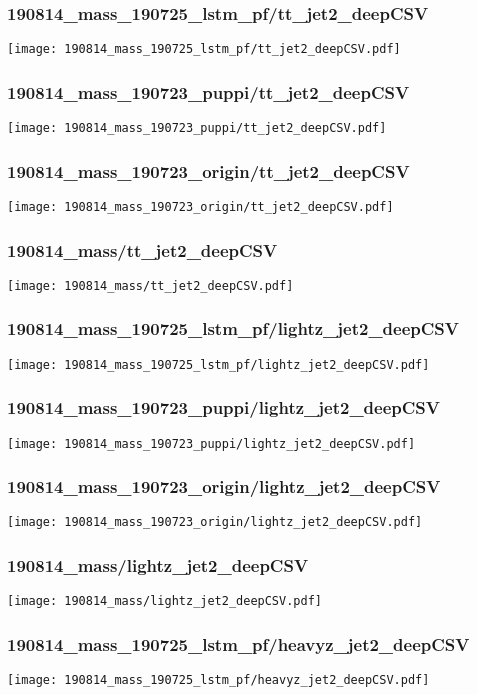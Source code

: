 \begin{frame}
   \frametitle{\small 190814\_mass\_190725\_lstm\_pf/tt\_jet2\_deepCSV}
   \centering
   \texttt{[image: 190814\_mass\_190725\_lstm\_pf/tt\_jet2\_deepCSV.pdf]}
\end{frame}

\begin{frame}
   \frametitle{\small 190814\_mass\_190723\_puppi/tt\_jet2\_deepCSV}
   \centering
   \texttt{[image: 190814\_mass\_190723\_puppi/tt\_jet2\_deepCSV.pdf]}
\end{frame}

\begin{frame}
   \frametitle{\small 190814\_mass\_190723\_origin/tt\_jet2\_deepCSV}
   \centering
   \texttt{[image: 190814\_mass\_190723\_origin/tt\_jet2\_deepCSV.pdf]}
\end{frame}

\begin{frame}
   \frametitle{\small 190814\_mass/tt\_jet2\_deepCSV}
   \centering
   \texttt{[image: 190814\_mass/tt\_jet2\_deepCSV.pdf]}
\end{frame}

\begin{frame}
   \frametitle{\small 190814\_mass\_190725\_lstm\_pf/lightz\_jet2\_deepCSV}
   \centering
   \texttt{[image: 190814\_mass\_190725\_lstm\_pf/lightz\_jet2\_deepCSV.pdf]}
\end{frame}

\begin{frame}
   \frametitle{\small 190814\_mass\_190723\_puppi/lightz\_jet2\_deepCSV}
   \centering
   \texttt{[image: 190814\_mass\_190723\_puppi/lightz\_jet2\_deepCSV.pdf]}
\end{frame}

\begin{frame}
   \frametitle{\small 190814\_mass\_190723\_origin/lightz\_jet2\_deepCSV}
   \centering
   \texttt{[image: 190814\_mass\_190723\_origin/lightz\_jet2\_deepCSV.pdf]}
\end{frame}

\begin{frame}
   \frametitle{\small 190814\_mass/lightz\_jet2\_deepCSV}
   \centering
   \texttt{[image: 190814\_mass/lightz\_jet2\_deepCSV.pdf]}
\end{frame}

\begin{frame}
   \frametitle{\small 190814\_mass\_190725\_lstm\_pf/heavyz\_jet2\_deepCSV}
   \centering
   \texttt{[image: 190814\_mass\_190725\_lstm\_pf/heavyz\_jet2\_deepCSV.pdf]}
\end{frame}

